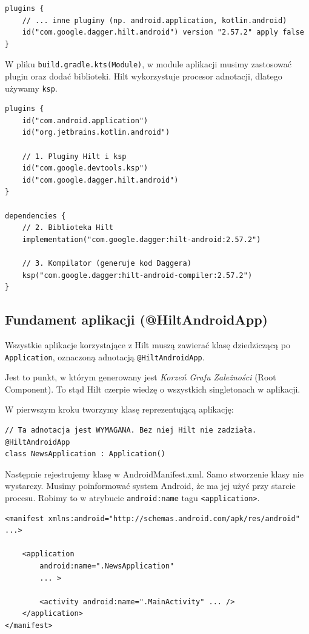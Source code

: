 \begin{verbatim}
plugins {
    // ... inne pluginy (np. android.application, kotlin.android)
    id("com.google.dagger.hilt.android") version "2.57.2" apply false
}
\end{verbatim}

W pliku \texttt{build.gradle.kts(Module)}, w module aplikacji musimy zastosować plugin oraz dodać biblioteki. Hilt wykorzystuje procesor adnotacji, dlatego używamy \texttt{ksp}.

\begin{verbatim}
plugins {
    id("com.android.application")
    id("org.jetbrains.kotlin.android")
    
    // 1. Pluginy Hilt i ksp
    id("com.google.devtools.ksp")
    id("com.google.dagger.hilt.android")
}

dependencies {
    // 2. Biblioteka Hilt
    implementation("com.google.dagger:hilt-android:2.57.2")
    
    // 3. Kompilator (generuje kod Daggera)
    ksp("com.google.dagger:hilt-android-compiler:2.57.2")
}
\end{verbatim}

\subsection{Fundament aplikacji (@HiltAndroidApp)}

Wszystkie aplikacje korzystające z Hilt muszą zawierać klasę dziedziczącą po \texttt{Application}, oznaczoną adnotacją \texttt{@HiltAndroidApp}.

Jest to punkt, w którym generowany jest \textit{Korzeń Grafu Zależności} (Root Component). To stąd Hilt czerpie wiedzę o wszystkich singletonach w aplikacji.

W pierwszym kroku tworzymy klasę reprezentującą aplikację:

\begin{verbatim}
// Ta adnotacja jest WYMAGANA. Bez niej Hilt nie zadziała.
@HiltAndroidApp
class NewsApplication : Application()
\end{verbatim}

Następnie rejestrujemy klasę w AndroidManifest.xml. Samo stworzenie klasy nie wystarczy. Musimy poinformować system Android, że ma jej użyć przy starcie procesu. Robimy to w atrybucie \texttt{android:name} tagu \texttt{<application>}.

\begin{verbatim}
<manifest xmlns:android="http://schemas.android.com/apk/res/android" ...>

    <application
        android:name=".NewsApplication" 
        ... >
        
        <activity android:name=".MainActivity" ... />
    </application>
</manifest>
\end{verbatim}

